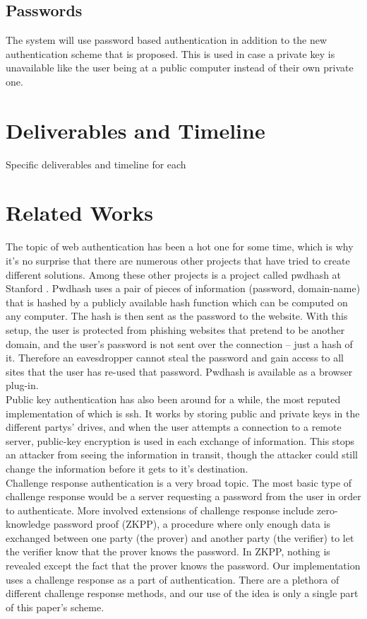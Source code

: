 \documentclass[11pt]{article}   %
\begin{document}
\subsection{Passwords} \label{sec:sol_pw}
The system will use password based authentication in addition to the new authentication scheme that is proposed. This is used in case a private key is unavailable like the user being at a public computer instead of their own private one.


\section{Deliverables and Timeline} \label{sec:deliv}
Specific deliverables and timeline for each

\section{Related Works} \label{sec:relate}
The topic of web authentication has been a hot one for some time, which is why it's no surprise that there are numerous other projects that have tried to create different solutions.  Among these other projects is a project called pwdhash at Stanford \cite{pwdhash}.  Pwdhash uses a pair of pieces of information (password, domain-name) that is hashed by a publicly available hash function which can be computed on any computer.  The hash is then sent as the password to the website.  With this setup, the user is protected from phishing websites that pretend to be another domain, and the user's password is not sent over the connection – just a hash of it.  Therefore an eavesdropper cannot steal the password and gain access to all sites that the user has re-used that password.  Pwdhash is available as a browser plug-in.\\
Public key authentication has also been around for a while, the most reputed implementation of which is ssh.  It works by storing public and private keys in the different partys' drives, and when the user attempts a connection to a remote server, public-key encryption is used in each exchange of information.  This stops an attacker from seeing the information in transit, though the attacker could still change the information before it gets to it's destination.\\
Challenge response authentication is a very broad topic.  The most basic type of challenge response would be a server requesting a password from the user in order to authenticate.  More involved extensions of challenge response include zero-knowledge password proof (ZKPP), a procedure where only enough data is exchanged between one party (the prover) and another party (the verifier) to let the verifier know that the prover knows the password.  In ZKPP, nothing is revealed except the fact that the prover knows the password.  Our implementation uses a challenge response as a part of authentication.  There are a plethora of different challenge response methods, and our use of the idea is only a single part of this paper's scheme.


{}
\end{document}
